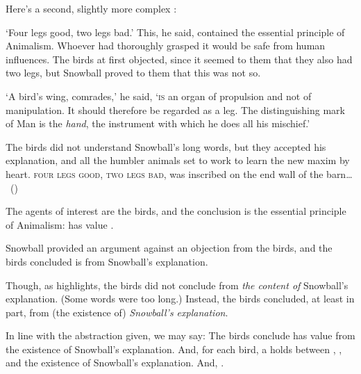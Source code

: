 \begin{note}
  Here's a second, slightly more complex :

  \begin{scenario}[Animalism]%
    \label{scen:animalism}%
    `Four legs good, two legs bad.'
    This, he said, contained the essential principle of Animalism.
    Whoever had thoroughly grasped it would be safe from human influences.
    The birds at first objected, since it seemed to them that they also had two legs, but Snowball proved to them that this was not so.

    `A bird's wing, comrades,' he said, `\textsc{is} an organ of propulsion and not of manipulation.
    It should therefore be regarded as a leg.
    The distinguishing mark of Man is the \emph{hand}, the instrument with which he does all his mischief.'

    The birds did not understand Snowball's long words, but they accepted his explanation, and all the humbler animals set to work to learn the new maxim by heart.
    \textsc{four legs good, two legs bad}, was inscribed on the end wall of the barn\dots%
    \mbox{ }\hfill\mbox{(\cite[25]{Orwell:1976aa})}%
    \newline
  \end{scenario}

  \noindent%
  The agents of interest are the birds, and the conclusion is the essential principle of Animalism:
   has value .

  Snowball provided an argument against an objection from the birds, and the birds concluded  is  from Snowball's explanation.

  Though, as \citeauthor{Orwell:1976aa} highlights, the birds did not conclude  from \emph{the content of} Snowball's explanation.
  (Some words were too long.)
  Instead, the birds concluded, at least in part, from (the existence of) \emph{Snowball's explanation}.

\end{note}


\begin{note}
  In line with the abstraction given, we may say:
  The birds conclude  has value  from the existence of Snowball's explanation.
  And, for each bird, a \ros{} holds between , , and the existence of Snowball's explanation.
  {
    \color{red}
    And, .
  }
\end{note}



